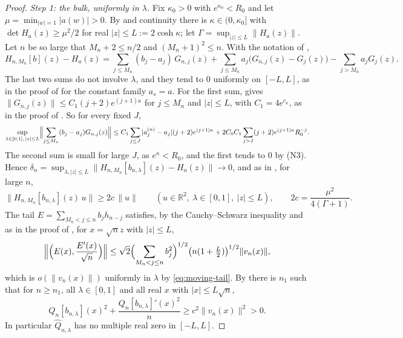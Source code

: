 \documentclass[11pt]{amsart}
\theoremstyle{definition}
\theoremstyle{remark}
\numberwithin{equation}{section}
\newcommand{\R}{\mathbb{R}}
\begin{document}
\begin{proof}
\emph{Step 1: the bulk, uniformly in $\lambda$.} Fix $\kappa_0>0$ with $e^{\kappa_0}<R_0$ and let $\mu=\min_{|w|=1}|a(w)|>0$. By \cite[Lemma~\ref{M-lem:limit}]{Main} and continuity there is $\kappa\in(0,\kappa_0]$ with $\det H_a(z)\ge\mu^2/2$ for real $|z|\le L:=2\cosh\kappa$; let $\Gamma=\sup_{|z|\le L}\|H_a(z)\|$. Let $n$ be so large that $M_n+2\le n/2$ and $(M_n+1)^2\le n$. With the notation of \cite[Section~\ref{M-sec:bulk}]{Main},
\[
H_{n,M_n}[b](z)-H_a(z)=\sum_{j\le M_n}(b_j-a_j)\,G_{n,j}(z)+\sum_{j\le M_n}a_j\bigl(G_{n,j}(z)-G_j(z)\bigr)-\sum_{j>M_n}a_jG_j(z).
\]
The last two sums do not involve $\lambda$, and they tend to $0$ uniformly on $[-L,L]$, as in the proof of \cite[\eqref{M-eq:head-conv}]{Main} for the constant family $a_s=a$. For the first sum, \cite[Lemma~\ref{M-lem:transfer}]{Main} gives $\|G_{n,j}(z)\|\le C_1(j+2)e^{(j+1)\kappa}$ for $j\le M_n$ and $|z|\le L$, with $C_1=4e^{c_\kappa}$, as in the proof of \cite[Proposition~\ref{M-prop:bulk}]{Main}. So for every fixed $J$,
\[
\sup_{\lambda\in[0,1],\,|z|\le L}\Bigl\|\sum_{j\le M_n}(b_j-a_j)G_{n,j}(z)\Bigr\|\le C_1\sum_{j\le J}|a^{(n)}_j-a_j|(j+2)e^{(j+1)\kappa}+2C_0C_1\sum_{j>J}(j+2)e^{(j+1)\kappa}R_0^{-j}.
\]
The second sum is small for large $J$, as $e^\kappa<R_0$, and the first tends to $0$ by (N3). Hence $\delta_n=\sup_{\lambda,|z|\le L}\|H_{n,M_n}[b_{n,\lambda}](z)-H_a(z)\|\to0$, and as in \cite[\eqref{M-eq:head-lower}]{Main}, for large $n$,
\[
\|H_{n,M_n}[b_{n,\lambda}](z)\,u\|\ge2c\,\|u\|\qquad(u\in\R^2,\ \lambda\in[0,1],\ |z|\le L),\qquad2c=\frac{\mu^2}{4(\Gamma+1)} .
\]
The tail $E=\sum_{M_n<j\le n}b_jh_{n-j}$ satisfies, by the Cauchy--Schwarz inequality and \cite[Lemma~\ref{M-lem:cd}]{Main} as in the proof of \cite[Proposition~\ref{M-prop:bulk}]{Main}, for $x=\sqrt nz$ with $|z|\le L$,
\[
\Bigl\|\Bigl(E(x),\frac{E'(x)}{\sqrt n}\Bigr)\Bigr\|\le\sqrt2\Bigl(\sum_{M_n<j\le n}b_j^2\Bigr)^{1/2}\bigl(n(1+\tfrac L2)\bigr)^{1/2}\|v_n(x)\|,
\]
which is $o(\|v_n(x)\|)$ uniformly in $\lambda$ by \eqref{eq:moving-tail}. By \cite[\eqref{M-eq:head}]{Main} there is $n_1$ such that for $n\ge n_1$, all $\lambda\in[0,1]$ and all real $x$ with $|x|\le L\sqrt n$,
\[
Q_n[b_{n,\lambda}](x)^2+\frac{Q_n[b_{n,\lambda}]'(x)^2}{n}\ge c^2\|v_n(x)\|^2>0 .
\]
In particular $\widehat Q_{n,\lambda}$ has no multiple real zero in $[-L,L]$.


\end{proof}
\end{document}
